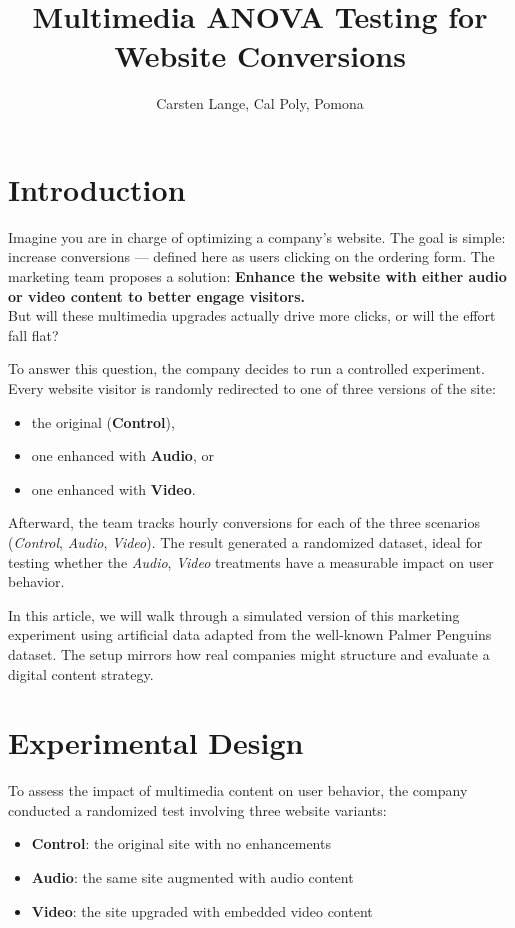 \documentclass[
  letterpaper,
  DIV=11,
  numbers=noendperiod]{scrartcl}
\title{Multimedia ANOVA Testing for Website Conversions}
\author{Carsten Lange, Cal Poly, Pomona}
\date{}
\providecommand{\tightlist}{%
  \setlength{\itemsep}{0pt}\setlength{\parskip}{0pt}}\usepackage{longtable,booktabs,array}
\begin{document}
\maketitle


\section{Introduction}\label{introduction}

Imagine you are in charge of optimizing a company's website. The goal is
simple: increase conversions --- defined here as users clicking on the
ordering form. The marketing team proposes a solution: \textbf{Enhance
the website with either audio or video content to better engage
visitors.\\
}But will these multimedia upgrades actually drive more clicks, or will
the effort fall flat?

To answer this question, the company decides to run a controlled
experiment. Every website visitor is randomly redirected to one of three
versions of the site:

\begin{itemize}
\tightlist
\item
  the original (\textbf{Control}),
\item
  one enhanced with \textbf{Audio}, or
\item
  one enhanced with \textbf{Video}.
\end{itemize}

Afterward, the team tracks hourly conversions for each of the three
scenarios (\emph{Control}, \emph{Audio}, \emph{Video}). The result
generated a randomized dataset, ideal for testing whether the
\emph{Audio}, \emph{Video} treatments have a measurable impact on user
behavior.

In this article, we will walk through a simulated version of this
marketing experiment using artificial data adapted from the well-known
Palmer Penguins dataset. The setup mirrors how real companies might
structure and evaluate a digital content strategy.

\section{Experimental Design}\label{experimental-design}

To assess the impact of multimedia content on user behavior, the company
conducted a randomized test involving three website variants:

\begin{itemize}
\tightlist
\item
  \textbf{Control}: the original site with no enhancements\\
\item
  \textbf{Audio}: the same site augmented with audio content\\
\item
  \textbf{Video}: the site upgraded with embedded video content
\end{itemize}
\end{document}
